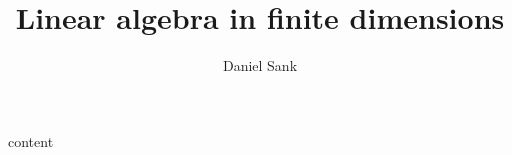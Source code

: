 \documentclass{article}
\title{Linear algebra in finite dimensions}
\author{Daniel Sank}
\begin{document}
\maketitle
{content}
\end{document}
